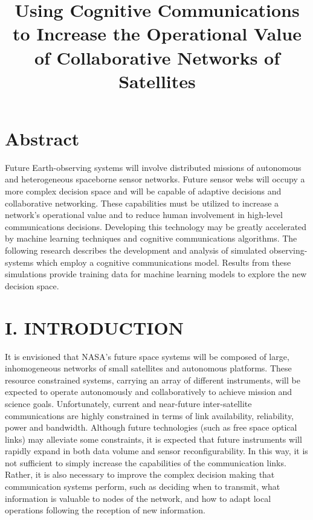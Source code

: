 \documentclass[11pt]{article}
\date{}
\title{Using Cognitive Communications to Increase the Operational Value of Collaborative Networks of Satellites}
\begin{document}
\maketitle
\section*{Abstract}
\label{sec:org6beeabe}

Future Earth-observing systems will involve distributed missions of autonomous
and heterogeneous spaceborne sensor networks.  Future sensor webs will occupy a
more complex decision space and will be capable of adaptive decisions and
collaborative networking.  These capabilities must be utilized to increase a
network's operational value and to reduce human involvement in high-level
communications decisions.  Developing this technology may be greatly accelerated
by machine learning techniques and cognitive communications algorithms.  The
following research describes the development and analysis of simulated
observing-systems which employ a cognitive communications model.  Results from
these simulations provide training data for machine learning models to explore
the new decision space.

\section*{I. INTRODUCTION}
\label{sec:org6dae6cd}

It is envisioned that NASA's future space systems will be composed of large,
inhomogeneous networks of small satellites and autonomous platforms.  These
resource constrained systems, carrying an array of different instruments, will
be expected to operate autonomously and collaboratively to achieve mission and
science goals.  Unfortunately, current and near-future inter-satellite
communications are highly constrained in terms of link availability,
reliability, power and bandwidth.  Although future technologies (such as free
space optical links) may alleviate some constraints, it is expected that future
instruments will rapidly expand in both data volume and sensor
reconfigurability.  In this way, it is not sufficient to simply increase the
capabilities of the communication links.  Rather, it is also necessary to
improve the complex decision making that communication systems perform, such as
deciding when to transmit, what information is valuable to nodes of the network,
and how to adapt local operations following the reception of new information.
\end{document}
